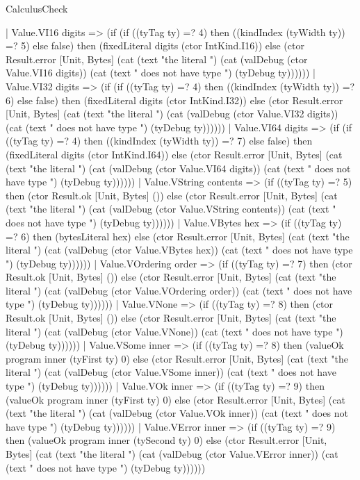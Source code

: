 \begin{lexlean}{CalculusCheck}
\begin{semanticmodule}
{    | Value.VI16 digits => (if (if ((tyTag ty) =? 4) then ((kindIndex (tyWidth ty)) =? 5) else false) then (fixedLiteral digits (ctor IntKind.I16)) else (ctor Result.error [Unit, Bytes] (cat (text "the literal ") (cat (valDebug (ctor Value.VI16 digits)) (cat (text " does not have type ") (tyDebug ty))))))
    | Value.VI32 digits => (if (if ((tyTag ty) =? 4) then ((kindIndex (tyWidth ty)) =? 6) else false) then (fixedLiteral digits (ctor IntKind.I32)) else (ctor Result.error [Unit, Bytes] (cat (text "the literal ") (cat (valDebug (ctor Value.VI32 digits)) (cat (text " does not have type ") (tyDebug ty))))))
    | Value.VI64 digits => (if (if ((tyTag ty) =? 4) then ((kindIndex (tyWidth ty)) =? 7) else false) then (fixedLiteral digits (ctor IntKind.I64)) else (ctor Result.error [Unit, Bytes] (cat (text "the literal ") (cat (valDebug (ctor Value.VI64 digits)) (cat (text " does not have type ") (tyDebug ty))))))
    | Value.VString contents => (if ((tyTag ty) =? 5) then (ctor Result.ok [Unit, Bytes] ()) else (ctor Result.error [Unit, Bytes] (cat (text "the literal ") (cat (valDebug (ctor Value.VString contents)) (cat (text " does not have type ") (tyDebug ty))))))
    | Value.VBytes hex => (if ((tyTag ty) =? 6) then (bytesLiteral hex) else (ctor Result.error [Unit, Bytes] (cat (text "the literal ") (cat (valDebug (ctor Value.VBytes hex)) (cat (text " does not have type ") (tyDebug ty))))))
    | Value.VOrdering order => (if ((tyTag ty) =? 7) then (ctor Result.ok [Unit, Bytes] ()) else (ctor Result.error [Unit, Bytes] (cat (text "the literal ") (cat (valDebug (ctor Value.VOrdering order)) (cat (text " does not have type ") (tyDebug ty))))))
    | Value.VNone => (if ((tyTag ty) =? 8) then (ctor Result.ok [Unit, Bytes] ()) else (ctor Result.error [Unit, Bytes] (cat (text "the literal ") (cat (valDebug (ctor Value.VNone)) (cat (text " does not have type ") (tyDebug ty))))))
    | Value.VSome inner => (if ((tyTag ty) =? 8) then (valueOk program inner (tyFirst ty) 0) else (ctor Result.error [Unit, Bytes] (cat (text "the literal ") (cat (valDebug (ctor Value.VSome inner)) (cat (text " does not have type ") (tyDebug ty))))))
    | Value.VOk inner => (if ((tyTag ty) =? 9) then (valueOk program inner (tyFirst ty) 0) else (ctor Result.error [Unit, Bytes] (cat (text "the literal ") (cat (valDebug (ctor Value.VOk inner)) (cat (text " does not have type ") (tyDebug ty))))))
    | Value.VError inner => (if ((tyTag ty) =? 9) then (valueOk program inner (tySecond ty) 0) else (ctor Result.error [Unit, Bytes] (cat (text "the literal ") (cat (valDebug (ctor Value.VError inner)) (cat (text " does not have type ") (tyDebug ty))))))
}
\end{semanticmodule}
\end{lexlean}
